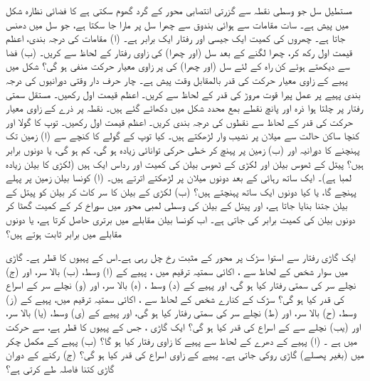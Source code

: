 مستطیل سل جو وسطی نقطہ  سے گزرتی انتصابی محور کے گرد گھوم سکتی ہے کا فضائی نظارہ شکل  میں پیش ہے۔ سات مقامات سے ہوائی بندوق سے  چھرا  سل پر مارا جا سکتا ہے، جو سل میں دھنس جاتا ہے۔ چھروں کی کمیت ایک جیسی اور رفتار ایک برابر ہے۔ (ا)   مقامات کی درجہ بندی، اعظم  قیمت اول رکھ کر،   چھرا لگنے کے بعد سل (اور  چھرا)  کی زاوی رفتار  کے لحاظ سے کریں۔ (ب)  فضا سے  دیکھتے ہوئے  کن راہ  کے لئے سل (اور چھرا) کی      پر زاوی معیار حرکت  منفی ہو گی؟
شکل  میں پہیے  کے زاوی معیار حرکت کی قدر  بالمقابل وقت  پیش ہے۔ چار  حرف دار وقتی دورانیوں  کی درجہ بندی پہیے پر  عمل پیرا   قوت مروڑ کی قدر کے لحاظ سے کریں۔ اعظم قیمت اول رکھیں۔
مستقل سمتی رفتار  پر چلتا ہوا ذرہ اور پانچ نقطے  بمع   محدد شکل  میں دکھائے گئے ہیں۔ نقطہ پر ذرے  کے زاوی معیار حرکت کی قدر  کے لحاظ سے نقطوں کی درجہ بندی کریں۔ اعظم قیمت اول رکھیں۔
توپ کا گولا اور کنچا ساکن حالت سے میلان پر نشیب وار  لڑھکتے ہیں۔ کیا توپ کے  گولے کا  کنچے سے (ا) زمین تک پہنچنے کا دورانیہ اور (ب)  زمین پر پہنچ کر خطی حرکی توانائی   زیادہ ہو گی، کم ہو گی، یا  دونوں  برابر ہیں؟
  پیتل کے ٹھوس بیلن  اور لکڑی کے ٹھوس بیلن کی کمیت اور رداس ایک ہیں (لکڑی  کا بیلن زیادہ لمبا ہے)۔  ایک ساتھ رہائی کے بعد دونوں  میلان پر  لڑھکتے اترتے ہیں۔ (ا)  کونسا بیلن زمین پر پہلے پہنچے گا، یا  کیا دونوں ایک ساتھ پہنچتے ہیں؟ (ب)  لکڑی کے بیلن کا سر   کاٹ کر بیلن کو پیتل کے بیلن جتنا    بنایا جاتا ہے، اور پیتل کے بیلن  کی  وسطی لمبی محور  میں سوراخ کر کے کمیت گھٹا کر دونوں بیلن کی کمیت برابر کی جاتی ہے۔ اب کونسا بیلن مقابلے میں برتری حاصل کرتا ہے، یا دونوں مقابلے میں  برابر ثابت ہوتے ہیں؟

\setcounter{questioncounter}{0}
ایک گاڑی  رفتار سے   استوا سڑک  پر محور  کے مثبت رخ چل رہی ہے۔اس کے  پہیوں کا قطر  ہے۔ گاڑی میں سوار شخص کے لحاظ سے  ، اکائی سمتیہ ترقیم میں ، پہیے کے   (ا) وسط، (ب) بالا سر، اور (ج)  نچلے سر کی سمتی رفتار  کیا ہو گی، اور  پہیے کے  (د) وسط ، (ہ) بالا سر، اور (و) نچلے سر  کے اسراع کی قدر    کیا ہو گی؟ سڑک کے کنارے شخص کے لحاظ سے ، اکائی سمتیہ ترقیم میں،  پہیے کے    (ز)  وسط، (ح) بالا سر، اور (ط) نچلے سر کی سمتی رفتار  کیا ہو گی، اور پہیے کے (ی) وسط، (یا) بالا سر، اور (یب) نچلے سے کے اسراع کی قدر  کیا ہو گی؟
ایک گاڑی  ، جس کے پہیوں کا قطر  ہے،   سے حرکت میں ہے ۔ (ا) پہیے کے دھرے کے لحاظ سے پہیے کا زاوی رفتار کیا ہو گا؟ (ب)   پہیے کے  مکمل چکر میں (بغیر پھسلے)  گاڑی روکی جاتی ہے۔ پہیے کے زاوی اسراع کی قدر کیا ہو گی؟ (ج)  رکنے کے دوران گاڑی کتنا فاصلہ طے کرتی ہے؟

